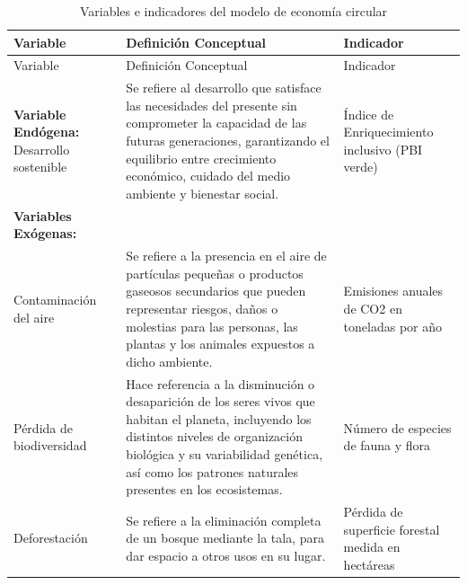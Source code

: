 \documentclass[
  stu,
  floatsintext,
  longtable,
  a4paper,
  nolmodern,
  notxfonts,
  notimes,
  12pt,
  colorlinks=true,linkcolor=blue,citecolor=blue,urlcolor=blue]{apa7}
\begin{document}
\begin{longtable}[]{@{}
  >{\raggedright\arraybackslash}p{}
  >{\raggedright\arraybackslash}p{}
  >{\raggedright\arraybackslash}p{}@{}}
\caption{Variables e indicadores del modelo de economía
circular}\tabularnewline
\toprule\noalign{}
\begin{minipage}[b]{\linewidth}\raggedright
Variable
\end{minipage} & \begin{minipage}[b]{\linewidth}\raggedright
Definición Conceptual
\end{minipage} & \begin{minipage}[b]{\linewidth}\raggedright
Indicador
\end{minipage} \\
\midrule\noalign{}
\endfirsthead
\toprule\noalign{}
\begin{minipage}[b]{\linewidth}\raggedright
Variable
\end{minipage} & \begin{minipage}[b]{\linewidth}\raggedright
Definición Conceptual
\end{minipage} & \begin{minipage}[b]{\linewidth}\raggedright
Indicador
\end{minipage} \\
\midrule\noalign{}
\endhead
\bottomrule\noalign{}
\endlastfoot
\textbf{Variable Endógena:} Desarrollo sostenible & Se refiere al
desarrollo que satisface las necesidades del presente sin comprometer la
capacidad de las futuras generaciones, garantizando el equilibrio entre
crecimiento económico, cuidado del medio ambiente y bienestar social. &
Índice de Enriquecimiento inclusivo (PBI verde) \\
\textbf{Variables Exógenas:} & & \\
Contaminación del aire & Se refiere a la presencia en el aire de
partículas pequeñas o productos gaseosos secundarios que pueden
representar riesgos, daños o molestias para las personas, las plantas y
los animales expuestos a dicho ambiente. & Emisiones anuales de CO2 en
toneladas por año \\
Pérdida de biodiversidad & Hace referencia a la disminución o
desaparición de los seres vivos que habitan el planeta, incluyendo los
distintos niveles de organización biológica y su variabilidad genética,
así como los patrones naturales presentes en los ecosistemas. & Número
de especies de fauna y flora \\
Deforestación & Se refiere a la eliminación completa de un bosque
mediante la tala, para dar espacio a otros usos en su lugar. & Pérdida
de superficie forestal medida en hectáreas \\
\end{longtable}
\end{document}
